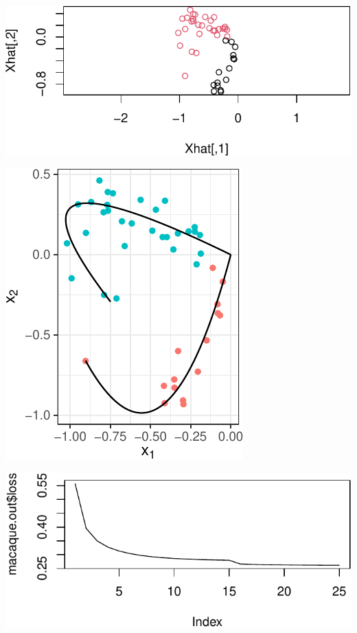 \documentclass[12pt]{article}
\begin{document}
\begin{example}


\begin{center}\includegraphics{draft_files/figure-latex/unnamed-chunk-8-1} \end{center}




\begin{center}\includegraphics{draft_files/figure-latex/unnamed-chunk-10-1} \end{center}


\begin{center}\includegraphics{draft_files/figure-latex/unnamed-chunk-11-1} \end{center}

\end{example}
\end{document}
